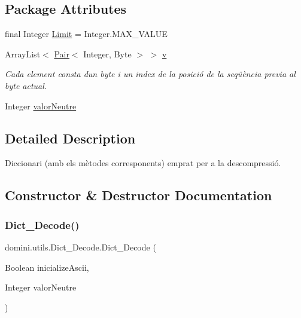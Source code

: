 \subsection*{Package Attributes}
\begin{DoxyCompactItemize}
\item 
final Integer \hyperlink{classdomini_1_1utils_1_1Dict__Decode_a10fd6693de70b9091942496b35324c5a}{Limit} = Integer.\+M\+A\+X\+\_\+\+V\+A\+L\+UE
\item 
Array\+List$<$ \hyperlink{classdomini_1_1utils_1_1Pair}{Pair}$<$ Integer, Byte $>$ $>$ \hyperlink{classdomini_1_1utils_1_1Dict__Decode_a351bb8836b391e5e21ebc9cc1943a22d}{v}
\begin{DoxyCompactList}\small\item\em Cada element consta d\textquotesingle{}un byte i un index de la posició de la seqüència previa al byte actual. \end{DoxyCompactList}\item 
Integer \hyperlink{classdomini_1_1utils_1_1Dict__Decode_a6ef2d17f449cf7a658a4bf983e2fb474}{valor\+Neutre}
\end{DoxyCompactItemize}


\subsection{Detailed Description}
Diccionari (amb els mètodes corresponents) emprat per a la descompressió. 

\subsection{Constructor \& Destructor Documentation}
\mbox{\label{classdomini_1_1utils_1_1Dict__Decode_a8a0f9e67c530bafc031e72c218ce74f8}} 
\subsubsection{\texorpdfstring{Dict\+\_\+\+Decode()}{Dict\_Decode()}}
{\footnotesize\ttfamily domini.\+utils.\+Dict\+\_\+\+Decode.\+Dict\+\_\+\+Decode (\begin{DoxyParamCaption}\item[{Boolean}]{inicialize\+Ascii,  }\item[{Integer}]{valor\+Neutre }\end{DoxyParamCaption})\hspace{0.3cm}{\ttfamily [inline]}}



